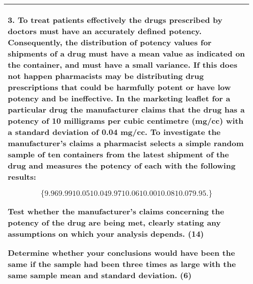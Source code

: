 \documentclass[a4paper,12pt]{article}
\begin{document}
\begin{table}[ht!]
     

\centering
     

\begin{tabular}{|p{15cm}|}
     

\hline 

 
3. To treat patients effectively the drugs prescribed by doctors must have an accurately defined potency.  Consequently, the distribution of potency values for shipments of a drug must have a mean value as indicated on the container, and must have a small variance.  If this does not happen pharmacists may be distributing drug prescriptions that could be harmfully potent or have low potency and be ineffective.  In the marketing leaflet for a particular drug the manufacturer claims that the drug has a potency of 10 milligrams per cubic centimetre (mg/cc) with a standard deviation of 0.04 mg/cc.  To investigate the manufacturer's claims a pharmacist selects a simple random sample of ten containers from the latest shipment of the drug and measures the potency of each with the following results: 
 
\[\{9.96   9.99   10.05   10.04   9.97   10.06   10.00   10.08   10.07   9.95 . \}\]
 
 Test whether the manufacturer’s claims concerning the potency of the drug are being met, clearly stating any assumptions on which your analysis depends. (14) 
 
 Determine whether your conclusions would have been the same if the sample had been three times as large with the same sample mean and standard deviation. (6) 

\\ \hline


\end{tabular}
    

\end{table}

\end{document}
